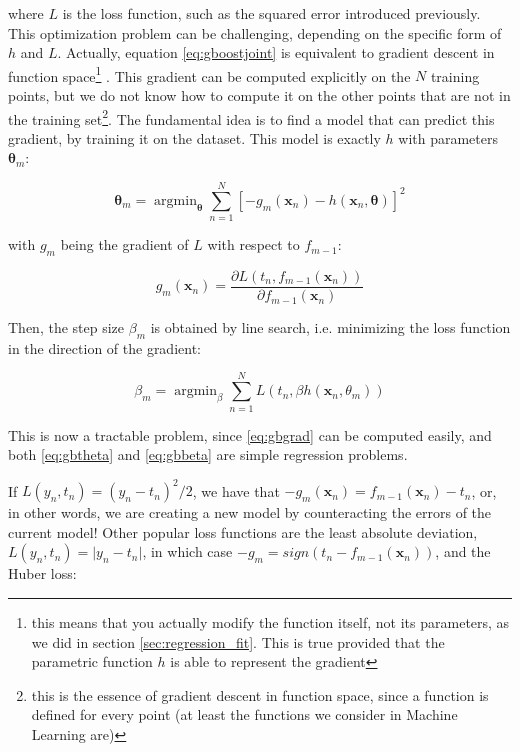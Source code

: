 \documentclass[a4paper]{book}
\DeclareMathOperator*{\argmin}{argmin}
\begin{document}
\noindent where $L$ is the loss function, such as the squared error introduced previously. This optimization problem can be challenging, depending on the specific form of $h$ and $L$. Actually, equation \ref{eq:gboostjoint} is equivalent to gradient descent in function space\footnote{this means that you actually modify the function itself, not its parameters, as we did in section \ref{sec:regression_fit}. This is true provided that the parametric function $h$ is able to represent the gradient} \citep{boostinggd,greedyboosting}. This gradient can be computed explicitly on the $N$ training points, but we do not know how to compute it on the other points that are not in the training set\footnote{this is the essence of gradient descent in function space, since a function is defined for every point (at least the functions we consider in Machine Learning are)}. The fundamental idea is to find a model that can predict this gradient, by training it on the dataset. This model is exactly $h$ with parameters $\bm\theta_m$:

\begin{equation}
\label{eq:gbtheta}
\bm\theta_m=\argmin_{\bm\theta}\sum_{n=1}^N \left[
-g_m(\bm x_n)-h(\bm x_n,\bm\theta)
\right]^2
\end{equation}

\noindent with $g_m$ being the gradient of $L$ with respect to $f_{m-1}$:

\begin{equation}
\label{eq:gbgrad}
g_m(\bm x_n)=\frac{\partial L(t_n,f_{m-1}(\bm x_n))}{\partial f_{m-1}(\bm x_n)}
\end{equation}

Then, the step size $\beta_m$ is obtained by line search, i.e. minimizing the loss function in the direction of the gradient:

\begin{equation}
\label{eq:gbbeta}
\beta_m=\argmin_{\beta}\sum_{n=1}^N L(t_n, \beta h(\bm x_n,\theta_m))
\end{equation}

This is now a tractable problem, since \ref{eq:gbgrad} can be computed easily, and both \ref{eq:gbtheta} and \ref{eq:gbbeta} are simple regression problems.

If $L(y_n,t_n)=(y_n-t_n)^2/2$, we have that $-g_m(\bm x_n)=f_{m-1}(\bm x_n)-t_n$, or, in other words, we are creating a new model by counteracting the errors of the current model! Other popular loss functions are the least absolute deviation, $L(y_n,t_n)=\vert y_n-t_n\vert$, in which case $-g_m=sign(t_n-f_{m-1}(\bm x_n))$, and the Huber loss:
\end{document}

